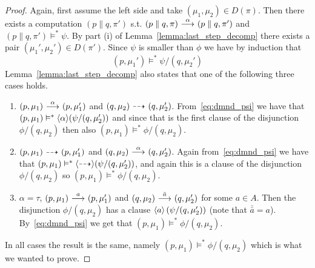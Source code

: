 \begin{proof}
    \par\nobreak
    \ltr Again, first assume the left side and take $(\mu_1,\mu_2)\in D(\pi)$. Then
    there exists a computation $(p\parallel q, \pi')$ s.t. $(p\parallel q, \pi) \ {\stackrel{{\alpha}}{\longrightarrow}}\ 
    (p\parallel q, \pi')$ and $(p\parallel q, \pi') \vDash^* \psi$.
    By part (i) of
    Lemma~\ref{lemma:last_step_decomp} there exists a pair $(\mu_1',\mu_2')\in D(\pi')$.
    Since $\psi$ is smaller than $\phi$ we have by induction that
    \begin{equation}\label{eq:dmnd_psi}
        (p,\mu_1') \vDash^* \psi / (q,\mu_2')
    \end{equation}
    Lemma~\ref{lemma:last_step_decomp} also states that one of the following three cases holds.
    \begin{enumerate}
        \item $(p,\mu_1)\ {\stackrel{{\alpha}}{\longrightarrow}}\ (p,\mu_1')$ and $(q,\mu_2)\ {\stackrel{_{}}{\dashrightarrow}}\ (q,\mu_2')$.
            From~\eqref{eq:dmnd_psi} we have that $(p,\mu_1) \vDash^*
            \mbox{\ensuremath{\langle \alpha \rangle}}(\psi/(q,\mu_2'))$ and since that is the first clause of the
            disjunction $\phi/(q,\mu_2)$ then also $(p,\mu_1) \vDash^* \phi/(q,\mu_2)$.
        \item $(p,\mu_1)\ {\stackrel{_{}}{\dashrightarrow}}\ (p,\mu_1')$ and $(q,\mu_2)\ {\stackrel{{\alpha}}{\longrightarrow}}\ (q,\mu_2')$.
            Again from~\eqref{eq:dmnd_psi} we have that $(p,\mu_1) \vDash^*
            \mbox{\ensuremath{\langle\stackrel{_{}}{\dashrightarrow}\rangle}}(\psi/(q,\mu_2'))$, and again this is a clause of the disjunction
            $\phi/(q,\mu_2)$ so $(p,\mu_1) \vDash^* \phi/(q,\mu_2)$.
        \item $\alpha = \tau$, $(p,\mu_1) \ {\stackrel{{a}}{\longrightarrow}}\  (p,\mu_1')$ and $(q,\mu_2)
            \ {\stackrel{{\bar{a}}}{\longrightarrow}}\  (q,\mu_2')$ for some $a\in A$. Then the disjunction
            $\phi/(q,\mu_2)$ has a clause $\mbox{\ensuremath{\langle a \rangle}}\left( \psi / (q,\mu_2') \right)$
            (note that $\bar{\bar{a}} = a$). By~\eqref{eq:dmnd_psi} we get that
            $(p,\mu_1) \vDash^* \phi / (q,\mu_2)$.
    \end{enumerate}
    In all cases the result is the same, namely $(p,\mu_1) \vDash^* \phi / (q,\mu_2)$
    which is what we wanted to prove.


\end{proof}
